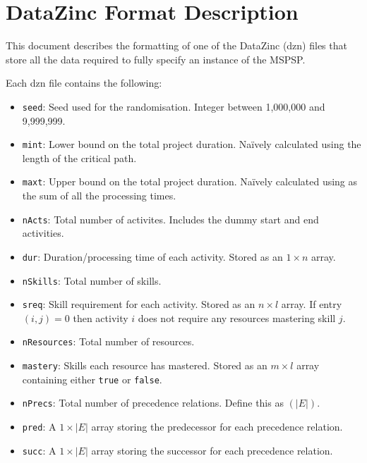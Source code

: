 \documentclass[12pt]{article}
\begin{document}
\section{DataZinc Format Description}

This document describes the formatting of one of the DataZinc (dzn) files
that store all the data required to fully specify an instance of
the MSPSP.

Each dzn file contains the following:
\begin{itemize}
    \item {\tt seed}: Seed used for the randomisation. Integer between 1,000,000 and 9,999,999.
    \item {\tt mint}: Lower bound on the total project duration. Na\"{i}vely calculated using 
        the length of the critical path.
    \item {\tt maxt}: Upper bound on the total project duration. Na\"{i}vely calculated using
        as the sum of all the processing times.
    \item {\tt nActs}: Total number of activites. Includes the dummy start and end activities.
    \item {\tt dur}: Duration/processing time of each activity. Stored as an $1\times n$ array.
    \item {\tt nSkills}: Total number of skills.
    \item {\tt sreq}: Skill requirement for each activity. Stored as an $n\times l$ array. If entry
    $(i,j)=0$ then activity $i$ does not require any resources mastering skill $j$.
    \item {\tt nResources}: Total number of resources.
    \item {\tt mastery}: Skills each resource has mastered. Stored as an $m\times l$ array containing
    either {\tt true} or {\tt false}.
    \item {\tt nPrecs}: Total number of precedence relations. Define this as $(|E|)$.
    \item {\tt pred}: A $1\times |E|$ array storing the predecessor for each precedence relation.
    \item {\tt succ}: A $1\times |E|$ array storing the successor for each precedence relation.
\end{itemize}
\end{document}
